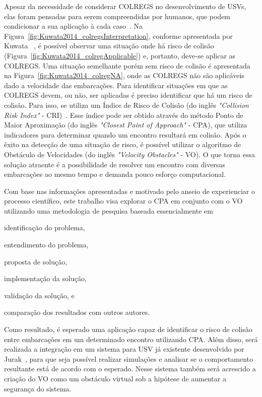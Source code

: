     Apesar da necessidade de considerar COLREGS no desenvolvimento de USVs, elas foram pensadas para serem compreendidas por humanos, que podem condicionar a sua aplicação à cada caso~\cite{KUWATA2014110}. Na Figura~\ref{fig:Kuwata2014_colregsInterpretation}, conforme apresentada por Kuwata \etal~\cite{KUWATA2014110}, é possível observar uma situação onde há risco de colisão (Figura~\ref{fig:Kuwata2014_colregApplicable}) e, portanto, deve-se aplicar as COLREGS. Uma situação semelhante porém sem risco de colisão é apresentada na Figura~\ref{fig:Kuwata2014_colregNA}, onde as COLREGS não são aplicáveis dado a velocidade das embarcações. Para identificar situações em que as COLREGS devem, ou não, ser aplicadas é preciso identificar que há um risco de colisão. Para isso, se utiliza um Índice de Risco de Colisão (do inglês \textit{"Collision Risk Index"} - CRI)~\cite{HUANG2019142}. Esse índice pode ser obtido através do método Ponto de Maior Aproximação (do inglês \textit{"Closest Point of Approach"} - CPA), que utiliza indicadores para determinar quando um encontro resultará em colisão. Após o êxito na detecção de uma situação de risco, é possível utilizar o algoritmo de Obstáculo de Velocidades (do inglês \textit{"Velocity Obstacles"} - VO). O que torna essa solução atraente é a possibilidade de resolver um encontro com diversas embarcações ao mesmo tempo e demanda pouco esforço computacional.
    
    Com base nas informações apresentadas e motivado pelo anseio de experienciar o processo científico, este trabalho visa explorar o CPA em conjunto com o VO utilizando uma metodologia de pesquisa baseada essencialmente em 
    \begin{enumerate*}[label=\alph*)]
        \item identificação do problema,
        \item entendimento do problema,
        \item proposta de solução,
        \item implementação da solução,
        \item validação da solução, e
        \item comparação dos resultados com outros autores.
    \end{enumerate*}
    Como resultado, é esperado uma aplicação capaz de identificar o risco de colisão entre embarcações em um determinado encontro utilizando CPA. Além disso, será realizada a integração em um sistema para USV já existente desenvolvido por Jurak~\cite{JURAK2020}, para que seja possível realizar simulações e analisar se o comportamento resultante está de acordo com o esperado. Nesse sistema também será acrescido a criação do VO como um obstáculo virtual sob a hipótese de aumentar a segurança do sistema.
    
